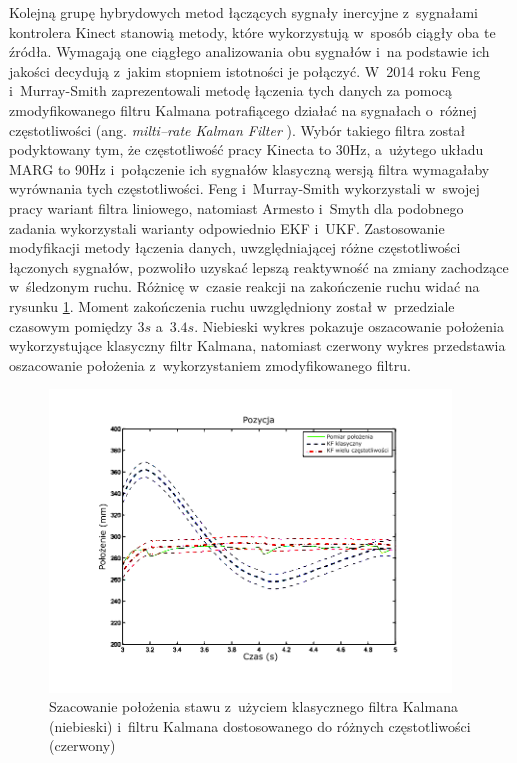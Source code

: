 Kolejną grupę hybrydowych metod łączących sygnały inercyjne z~sygnałami kontrolera Kinect stanowią metody, które wykorzystują w~sposób ciągły oba te źródła. Wymagają one ciągłego analizowania obu sygnałów i~na podstawie ich jakości decydują z~jakim stopniem istotności je połączyć. W~2014 roku Feng i~Murray-Smith \cite{Murray-Smith2014} zaprezentowali metodę łączenia tych danych za pomocą zmodyfikowanego filtru Kalmana potrafiącego działać na sygnałach o~różnej częstotliwości (ang. \emph{milti--rate Kalman Filter} \cite{Dhuli2009}). Wybór takiego filtra został podyktowany tym, że częstotliwość pracy Kinecta to 30Hz, a~użytego układu MARG to 90Hz i~połączenie ich sygnałów klasyczną wersją filtra wymagałaby wyrównania tych częstotliwości. Feng i~Murray-Smith wykorzystali w~swojej pracy wariant filtra liniowego, natomiast Armesto i~Smyth dla podobnego zadania wykorzystali warianty odpowiednio EKF\cite{Armesto01062007} i~UKF\cite{Smyth2007}. Zastosowanie modyfikacji metody łączenia danych, uwzględniającej różne częstotliwości łączonych sygnałów, pozwoliło uzyskać lepszą reaktywność na zmiany zachodzące w~śledzonym ruchu. Różnicę w~czasie reakcji na zakończenie ruchu widać na rysunku \ref{fig:literature:feng}. Moment zakończenia ruchu uwzględniony został w~przedziale czasowym pomiędzy $3s$ a~$3.4s$. Niebieski wykres pokazuje oszacowanie położenia wykorzystujące klasyczny filtr Kalmana, natomiast czerwony wykres przedstawia oszacowanie położenia z~wykorzystaniem zmodyfikowanego filtru.
		
\begin{figure}[!htp]
	\centering 
	\includegraphics[width=0.95\textwidth]{images/Fig03.png}	
	\caption{Szacowanie położenia stawu z~użyciem klasycznego filtra Kalmana (niebieski) i~filtru Kalmana dostosowanego do różnych częstotliwości (czerwony) \cite{Murray-Smith2014}}
	\label{fig:literature:feng}
\end{figure}
		
